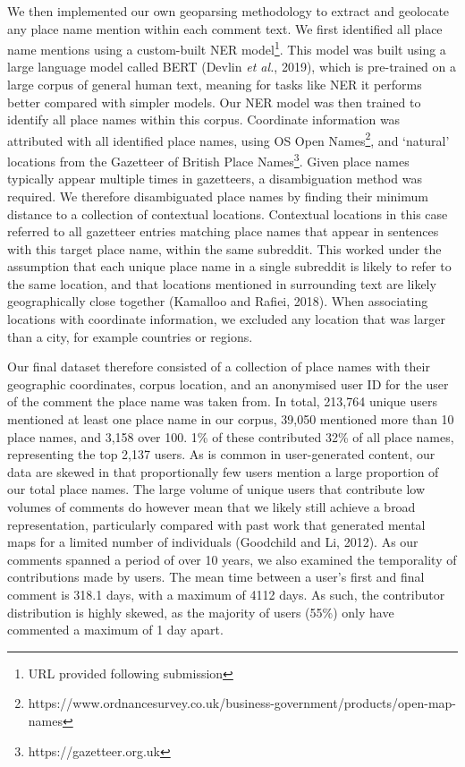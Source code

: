 \documentclass[
  letterpaper,
  11pt,
  english,
  onehalfspacing,
  headsepline]{MastersDoctoralThesis}
\begin{document}
We then implemented our own geoparsing methodology to extract and
geolocate any place name mention within each comment text. We first
identified all place name mentions using a custom-built NER
model\footnote{URL provided following submission}. This model was built
using a large language model called BERT (Devlin \emph{et al.}, 2019),
which is pre-trained on a large corpus of general human text, meaning
for tasks like NER it performs better compared with simpler models. Our
NER model was then trained to identify all place names within this
corpus. Coordinate information was attributed with all identified place
names, using OS Open Names\footnote{https://www.ordnancesurvey.co.uk/business-government/products/open-map-names},
and `natural' locations from the Gazetteer of British Place
Names\footnote{https://gazetteer.org.uk}. Given place names typically
appear multiple times in gazetteers, a disambiguation method was
required. We therefore disambiguated place names by finding their
minimum distance to a collection of contextual locations. Contextual
locations in this case referred to all gazetteer entries matching place
names that appear in sentences with this target place name, within the
same subreddit. This worked under the assumption that each unique place
name in a single subreddit is likely to refer to the same location, and
that locations mentioned in surrounding text are likely geographically
close together (Kamalloo and Rafiei, 2018). When associating locations
with coordinate information, we excluded any location that was larger
than a city, for example countries or regions.

Our final dataset therefore consisted of a collection of place names
with their geographic coordinates, corpus location, and an anonymised
user ID for the user of the comment the place name was taken from. In
total, 213,764 unique users mentioned at least one place name in our
corpus, 39,050 mentioned more than 10 place names, and 3,158 over 100.
1\% of these contributed 32\% of all place names, representing the top
2,137 users. As is common in user-generated content, our data are skewed
in that proportionally few users mention a large proportion of our total
place names. The large volume of unique users that contribute low
volumes of comments do however mean that we likely still achieve a broad
representation, particularly compared with past work that generated
mental maps for a limited number of individuals (Goodchild and Li,
2012). As our comments spanned a period of over 10 years, we also
examined the temporality of contributions made by users. The mean time
between a user's first and final comment is 318.1 days, with a maximum
of 4112 days. As such, the contributor distribution is highly skewed, as
the majority of users (55\%) only have commented a maximum of 1 day
apart.
\end{document}
